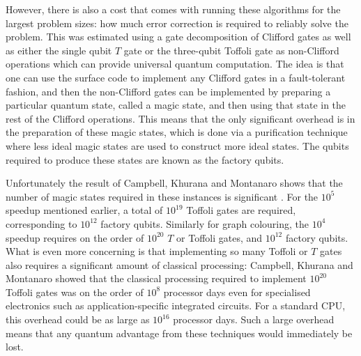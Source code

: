 However, there is also a cost that comes with running these algorithms for the largest problem sizes: how much error correction is required to reliably solve the problem. This was estimated using a gate decomposition of Clifford gates as well as either the single qubit $T$ gate or the three-qubit Toffoli gate as non-Clifford operations which can provide universal quantum computation. The idea is that one can use the surface code to implement any Clifford gates in a fault-tolerant fashion, and then the non-Clifford gates can be implemented by preparing a particular quantum state, called a magic state, and then using that state in the rest of the Clifford operations. This means that the only significant overhead is in the preparation of these magic states, which is done via a purification technique where less ideal magic states are used to construct more ideal states. The qubits required to produce these states are known as the factory qubits.

Unfortunately the result of Campbell, Khurana and Montanaro shows that the number of magic states required in these instances is significant \cite{campbell2019}. For the $10^5$ speedup mentioned earlier, a total of $10^{19}$ Toffoli gates are required, corresponding to $10^{12}$ factory qubits. Similarly for graph colouring, the $10^4$ speedup requires on the order of $10^{20}$ $T$ or Toffoli gates, and $10^{12}$ factory qubits. What is even more concerning is that implementing so many Toffoli or $T$ gates also requires a significant amount of classical processing: Campbell, Khurana and Montanaro showed that the classical processing required to implement $10^{20}$ Toffoli gates was on the order of $10^8$ processor days even for specialised electronics such as application-specific integrated circuits. For a standard CPU, this overhead could be as large as $10^{16}$ processor days. Such a large overhead means that any quantum advantage from these techniques would immediately be lost.

